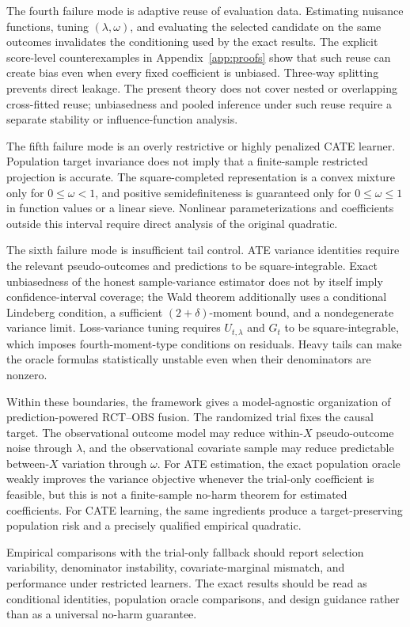 The fourth failure mode is adaptive reuse of evaluation data. Estimating nuisance functions, tuning $(\lambda,\omega)$, and evaluating the selected candidate on the same outcomes invalidates the conditioning used by the exact results. The explicit score-level counterexamples in Appendix~\ref{app:proofs} show that such reuse can create bias even when every fixed coefficient is unbiased. Three-way splitting prevents direct leakage. The present theory does not cover nested or overlapping cross-fitted reuse; unbiasedness and pooled inference under such reuse require a separate stability or influence-function analysis.

The fifth failure mode is an overly restrictive or highly penalized CATE learner. Population target invariance does not imply that a finite-sample restricted projection is accurate. The square-completed representation is a convex mixture only for $0\leq\omega<1$, and positive semidefiniteness is guaranteed only for $0\leq\omega\leq1$ in function values or a linear sieve. Nonlinear parameterizations and coefficients outside this interval require direct analysis of the original quadratic.

The sixth failure mode is insufficient tail control. ATE variance identities require the relevant pseudo-outcomes and predictions to be square-integrable. Exact unbiasedness of the honest sample-variance estimator does not by itself imply confidence-interval coverage; the Wald theorem additionally uses a conditional Lindeberg condition, a sufficient $(2+\delta)$-moment bound, and a nondegenerate variance limit. Loss-variance tuning requires $U_{t,\lambda}$ and $G_t$ to be square-integrable, which imposes fourth-moment-type conditions on residuals. Heavy tails can make the oracle formulas statistically unstable even when their denominators are nonzero.

Within these boundaries, the framework gives a model-agnostic organization of prediction-powered RCT--OBS fusion. The randomized trial fixes the causal target. The observational outcome model may reduce within-$X$ pseudo-outcome noise through $\lambda$, and the observational covariate sample may reduce predictable between-$X$ variation through $\omega$. For ATE estimation, the exact population oracle weakly improves the variance objective whenever the trial-only coefficient is feasible, but this is not a finite-sample no-harm theorem for estimated coefficients. For CATE learning, the same ingredients produce a target-preserving population risk and a precisely qualified empirical quadratic.

Empirical comparisons with the trial-only fallback should report selection variability, denominator instability, covariate-marginal mismatch, and performance under restricted learners. The exact results should be read as conditional identities, population oracle comparisons, and design guidance rather than as a universal no-harm guarantee.
